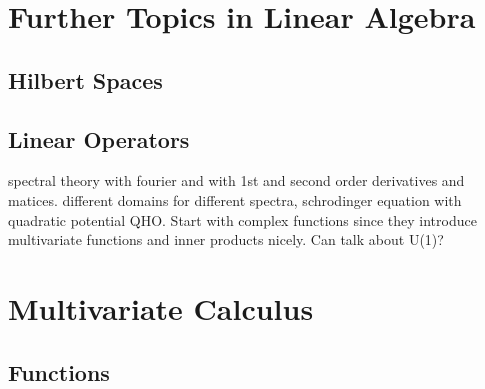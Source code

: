 \documentclass[12pt,letterpaper, openany]{book} %
\begin{document}
 
\frontmatter



%
 
\clearpage
\thispagestyle{empty}
 
\tableofcontents
 
\mainmatter

\setcounter{part}{4}
\part{Further Topics in Linear Algebra}
\chapter{Hilbert Spaces}
%

\chapter{Linear Operators}
spectral theory with fourier and with 1st and second order derivatives and matices. different domains for different spectra, schrodinger equation with quadratic potential QHO.  Start with complex functions since they introduce multivariate functions and inner products nicely. Can talk about U(1)?

\part{Multivariate Calculus}
\chapter{Functions}





\end{document}
